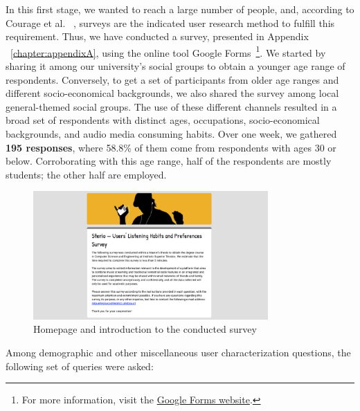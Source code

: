 In this first stage, we wanted to reach a large number of people, and, according to Courage et al. ~\cite{Courage2005}, surveys are the indicated user research method to fulfill this requirement. Thus, we have conducted a survey, presented in Appendix ~\ref{chapter:appendixA}, using the online tool Google Forms~\footnote{For more information, visit the \href{http://forms.google.com/}{Google Forms website}.}. We started by sharing it among our university’s social groups to obtain a younger age range of respondents. Conversely, to get a set of participants from older age ranges and different socio-economical backgrounds, we also shared the survey among local general-themed social groups. The use of these different channels resulted in a broad set of respondents with distinct ages, occupations, socio-economical backgrounds, and audio media consuming habits. Over one week, we gathered \textbf{195 responses}, where 58.8\% of them come from respondents with ages 30 or below. Corroborating with this age range, half of the respondents are mostly students; the other half are employed.


\begin{figure}[h]
\centering
\includegraphics[width=0.8\textwidth]{./Images/survey.png}
\caption{Homepage and introduction to the conducted survey}
\label{fig:test_env}
\end{figure}

Among demographic and other miscellaneous user characterization questions, the following set of queries were asked:

